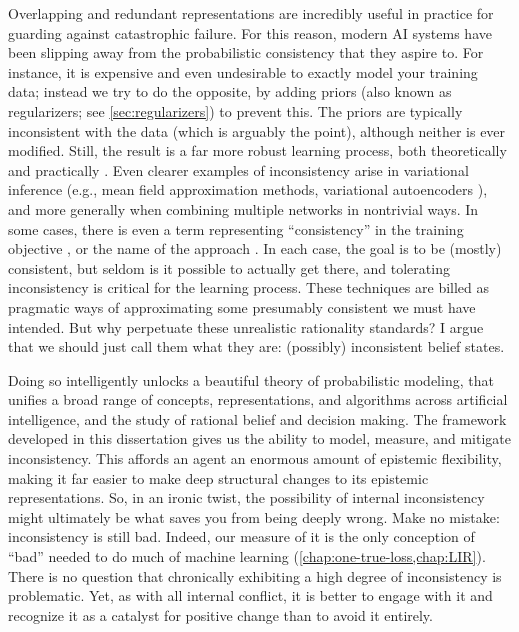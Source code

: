 Overlapping and redundant representations are incredibly useful in practice for guarding against catastrophic failure. 
For this reason, modern AI systems have been slipping away from the probabilistic consistency that they aspire to.
For instance, it is expensive and even undesirable to exactly model your training data; instead we try to do the opposite, by adding priors (also known as regularizers; see \cref{sec:regularizers}) to prevent this.
The priors are typically inconsistent with the data (which is arguably the point), although neither is ever modified. 
Still, the result is a far more robust learning process, both theoretically \citep{ftrl} and practically \citep{girosi1995regularization}.
%
Even clearer examples of inconsistency arise in variational inference
    (e.g., mean field approximation methods, variational autoencoders \citep{kingma2013autoencoding}),
    and more generally when combining multiple networks in nontrivial ways.
    In some cases, there is even a term representing ``consistency'' in the training objective \citep{CycleGAN2017}, or the name of the approach \citep{learning-loc-glob-consistency,temp-cycle-consist-2019CVPR}. 
In each case, the goal is to be (mostly) consistent, but seldom is it possible to actually get there,
and tolerating inconsistency is critical for the learning process.
%
These techniques are billed
    as pragmatic ways of approximating
    some presumably consistent we must have intended.
But why perpetuate these unrealistic rationality standards?
I argue that we should just call them what they are: (possibly) inconsistent belief states.

Doing so intelligently unlocks a beautiful theory of probabilistic modeling, that unifies a broad range of concepts, representations, and algorithms across artificial intelligence, and 
    the study of rational belief and decision making.
The framework developed in this dissertation
gives us the ability to model, measure, and mitigate inconsistency.
This affords an agent an enormous amount of epistemic flexibility,
    making it far easier to make deep structural changes to its epistemic
    representations.
So, in an ironic twist, the possibility of internal inconsistency might ultimately be what saves you from being deeply wrong. 
%
Make no mistake: inconsistency is still bad.
Indeed, our measure of it is the only conception of ``bad'' needed to do much of machine learning (\cref{chap:one-true-loss,chap:LIR}).
There is no question that chronically exhibiting a high degree of inconsistency is problematic.
%
Yet, as with all internal conflict, it is better to engage with it and recognize it as a catalyst for positive change
than to avoid it entirely. 

